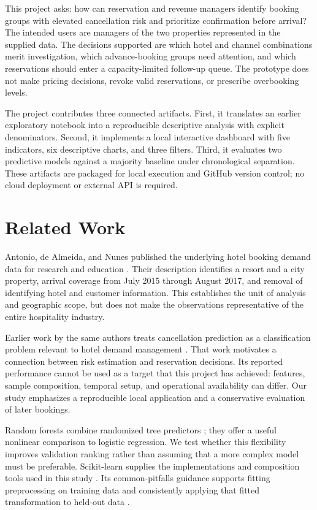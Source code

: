 \documentclass[conference]{IEEEtran}
\begin{document}
This project asks: how can reservation and revenue managers identify booking groups with elevated cancellation risk and prioritize confirmation before arrival? The intended users are managers of the two properties represented in the supplied data. The decisions supported are which hotel and channel combinations merit investigation, which advance-booking groups need attention, and which reservations should enter a capacity-limited follow-up queue. The prototype does not make pricing decisions, revoke valid reservations, or prescribe overbooking levels.

The project contributes three connected artifacts. First, it translates an earlier exploratory notebook into a reproducible descriptive analysis with explicit denominators. Second, it implements a local interactive dashboard with five indicators, six descriptive charts, and three filters. Third, it evaluates two predictive models against a majority baseline under chronological separation. These artifacts are packaged for local execution and GitHub version control; no cloud deployment or external API is required.

\section{Related Work}
Antonio, de Almeida, and Nunes published the underlying hotel booking demand data for research and education \cite{dataset}. Their description identifies a resort and a city property, arrival coverage from July 2015 through August 2017, and removal of identifying hotel and customer information. This establishes the unit of analysis and geographic scope, but does not make the observations representative of the entire hospitality industry.

Earlier work by the same authors treats cancellation prediction as a classification problem relevant to hotel demand management \cite{hotelprediction}. That work motivates a connection between risk estimation and reservation decisions. Its reported performance cannot be used as a target that this project has achieved: features, sample composition, temporal setup, and operational availability can differ. Our study emphasizes a reproducible local application and a conservative evaluation of later bookings.

Random forests combine randomized tree predictors \cite{breiman}; they offer a useful nonlinear comparison to logistic regression. We test whether this flexibility improves validation ranking rather than assuming that a more complex model must be preferable. Scikit-learn supplies the implementations and composition tools used in this study \cite{sklearn}. Its common-pitfalls guidance supports fitting preprocessing on training data and consistently applying that fitted transformation to held-out data \cite{pitfalls}.
\end{document}
